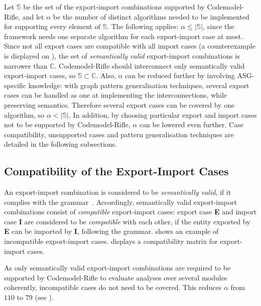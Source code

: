 Let $\mathbb{S}$ be the set of the export-import combinations supported by Codemodel-Rifle, and let $\alpha$ be the number of distinct algorithms needed to be implemented for supporting every element of $\mathbb{S}$. The following applies: $\alpha \leq |\mathbb{S}|$, since the framework needs one separate algorithm for each export-import case at most. Since not all export cases are compatible with all import cases (a counterexample is displayed on ), the set of \emph{semantically valid} export-import combinations is narrower than $\mathbb{C}$. Codemodel-Rifle should interconnect only semantically valid export-import cases, so $\mathbb{S} \subset \mathbb{C}$. Also, $\alpha$ can be reduced further by involving ASG-specific knowledge: with graph pattern generalisation techniques, several export cases can be handled as one at implementing the interconnections, while preserving semantics. Therefore several export cases can be covered by one algorithm, so $\alpha < |\mathbb{S}|$. In addition, by choosing particular export and import cases not to be supported by Codemodel-Rifle, $\alpha$ can be lowered even further. Case compatibility, unsupported cases and pattern generalisation techniques are detailed in the following subsections.


\subsection{Compatibility of the Export-Import Cases}

An export-import combination is considered to be \emph{semantically valid}, if it complies with the \es grammar~\cite{export-grammar, import-grammar}. Accordingly, semantically valid export-import combinations consist of \emph{compatible} export-import cases: export case \textbf{E} and import case \textbf{I} are considered to be \emph{compatible} with each other, if the entity exported by \textbf{E} can be imported by \textbf{I}, following the \es grammar.  shows an example of incompatible export-import cases.  displays a compatibility matrix for \es export-import cases.

As only semantically valid export-import combinations are required to be supported by Codemodel-Rifle to evaluate analyses over several \es modules coherently, incompatible cases do not need to be covered. This reduces $\alpha$ from $110$ to $79$ (see ).



